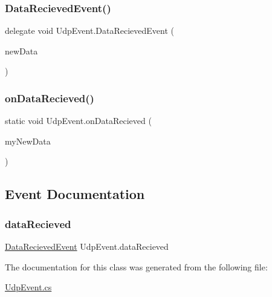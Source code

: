 \subsubsection{\texorpdfstring{Data\+Recieved\+Event()}{DataRecievedEvent()}}
{\footnotesize\ttfamily delegate void Udp\+Event.\+Data\+Recieved\+Event (\begin{DoxyParamCaption}\item[{\hyperlink{class_data_struct}{Data\+Struct}}]{new\+Data }\end{DoxyParamCaption})}

\mbox{\label{class_udp_event_a90b37ccb58abcdab80aef5375e48e87d}} 
\subsubsection{\texorpdfstring{on\+Data\+Recieved()}{onDataRecieved()}}
{\footnotesize\ttfamily static void Udp\+Event.\+on\+Data\+Recieved (\begin{DoxyParamCaption}\item[{\hyperlink{class_data_struct}{Data\+Struct}}]{my\+New\+Data }\end{DoxyParamCaption})\hspace{0.3cm}{\ttfamily [static]}}



\subsection{Event Documentation}
\mbox{\label{class_udp_event_a0df4003718113a278f920a70e27c261d}} 
\subsubsection{\texorpdfstring{data\+Recieved}{dataRecieved}}
{\footnotesize\ttfamily \hyperlink{class_udp_event_ae4e3558627292b1cc17947ba92a60906}{Data\+Recieved\+Event} Udp\+Event.\+data\+Recieved\hspace{0.3cm}{\ttfamily [static]}}



The documentation for this class was generated from the following file\+:\begin{DoxyCompactItemize}
\item 
\hyperlink{_udp_event_8cs}{Udp\+Event.\+cs}\end{DoxyCompactItemize}
